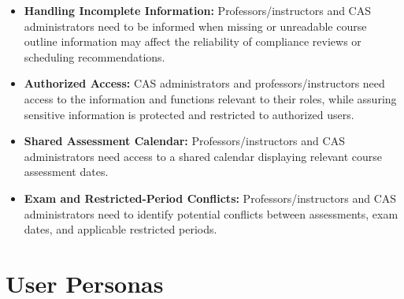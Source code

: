 \documentclass[12pt]{article}
\newcounter{srnum} %
\begin{document}
\begin{itemize}
\item[SR\refstepcounter{srnum}\thesrnum \label{SR-REC-04}:] \textbf{Handling Incomplete Information:} 
Professors/instructors and CAS administrators need to be informed when missing or unreadable 
course outline information may affect the reliability of compliance reviews or scheduling recommendations.

\item[SR\refstepcounter{srnum}\thesrnum \label{SR-REC-05}:] \textbf{Authorized Access:} 
CAS administrators and professors/instructors need access to the information and functions relevant 
to their roles, while assuring sensitive information is protected and restricted to authorized users.

\item[SR\refstepcounter{srnum}\thesrnum \label{SR-REC-06}:] \textbf{Shared Assessment Calendar:} 
Professors/instructors and CAS administrators need access to a shared calendar displaying 
relevant course assessment dates.

\item[SR\refstepcounter{srnum}\thesrnum \label{SR-REC-07}:] \textbf{Exam and Restricted-Period Conflicts:} 
Professors/instructors and CAS administrators need to identify potential conflicts between 
assessments, exam dates, and applicable restricted periods.

\end{itemize}



\section{User Personas}
\end{document}
